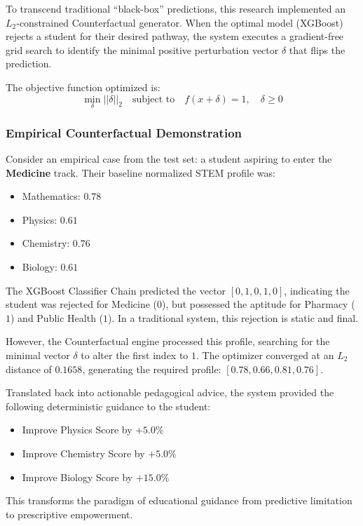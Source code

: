 To transcend traditional ``black-box'' predictions, this research implemented an $L_2$-constrained Counterfactual \parencite{wachter2017counterfactual} generator. When the optimal model (XGBoost) rejects a student for their desired pathway, the system executes a gradient-free grid search to identify the minimal positive perturbation vector $\delta$ that flips the prediction.

The objective function optimized is:
\begin{equation}
    \min_{\delta} || \delta ||_2 \quad \text{subject to} \quad f(x + \delta) = 1, \quad \delta \geq 0
\end{equation}

\subsubsection{Empirical Counterfactual \parencite{wachter2017counterfactual} Demonstration}

Consider an empirical case from the test set: a student aspiring to enter the \textbf{Medicine} track. Their baseline normalized STEM profile was:
\begin{itemize}
    \item Mathematics: $0.78$
    \item Physics: $0.61$
    \item Chemistry: $0.76$
    \item Biology: $0.61$
\end{itemize}

The XGBoost \parencite{chen2016xgboost} Classifier Chain \parencite{read2011classifier} predicted the vector $[0, 1, 0, 1, 0]$, indicating the student was rejected for Medicine ($0$), but possessed the aptitude for Pharmacy ($1$) and Public Health ($1$). In a traditional system, this rejection is static and final.

However, the Counterfactual \parencite{wachter2017counterfactual} engine processed this profile, searching for the minimal vector $\delta$ to alter the first index to $1$. The optimizer converged at an $L_2$ distance of $0.1658$, generating the required profile: $[0.78, 0.66, 0.81, 0.76]$. 

Translated back into actionable pedagogical advice, the system provided the following deterministic guidance to the student:
\begin{itemize}
    \item Improve Physics Score by $+5.0\%$
    \item Improve Chemistry Score by $+5.0\%$
    \item Improve Biology Score by $+15.0\%$
\end{itemize}
This transforms the paradigm of educational guidance from predictive limitation to prescriptive empowerment.

